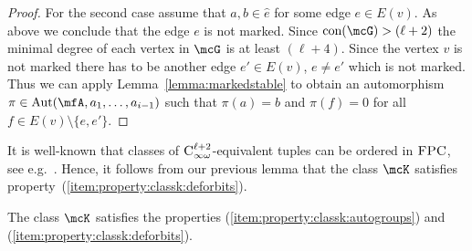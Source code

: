 \documentclass[a4paper,UKenglish]{lipics}
\newcommand{\Aut}{\ensuremath{\text{Aut}}\xspace}
\newcommand{\con}{\ensuremath{\text{con}}\xspace}
\newcommand{\logic}[1]{\ensuremath{\textsc{#1}}\xspace}
\newcommand{\FPC}{\logic{FPC}}
\newcommand{\INFCkx}[1]{\ensuremath{\logic{C}^{#1}_{\infty\omega}}\xspace}
\theoremstyle{plain}
\begin{document}
\begin{proof}
For the second case assume that $a,b \in \hat{e}$ for some edge $e \in E(v)$.
As above we conclude that the edge $e$ is not marked.
Since $\con(\mcG) > (\ell +2)$ the minimal degree of each 
vertex in $\mcG$ is at least $(\ell + 4)$. 
Since the vertex $v$ is not marked there has to be 
another edge $e' \in E(v)$, $e \neq e'$ which is not marked.
Thus we can apply 
Lemma~\ref{lemma:markedstable}
to obtain an automorphism $\pi \in \Aut(\mfA, a_1, \dots, a_{i-1})$ 
such that $\pi(a) = b$ and $\pi(f) = 0$ for all $f \in E(v) \setminus \{ 
e, 
e' \}$. 
\end{proof}

\medskip
It is well-known that classes of $\INFCkx{\ell +2}$-equivalent tuples 
can be ordered in $\FPC$, see e.g.\ \cite{Ot97}.
Hence, it follows from our previous lemma that the class $\mcK$ satisfies 
property~(\ref{item:property:classk:deforbits}). 

\begin{lemma} \label{lemma:slv:classk:prop:12}
The class $\mcK$ satisfies the properties
(\ref{item:property:classk:autogroups}) and
(\ref{item:property:classk:deforbits}).
\end{lemma}
\end{document}
